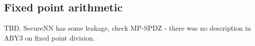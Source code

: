\subsection{Fixed point arithmetic}
\label{subsec:fixed-point}




TBD. SecureNN has some leakage, check MP-SPDZ - there was no description in
ABY3 on fixed point division.

